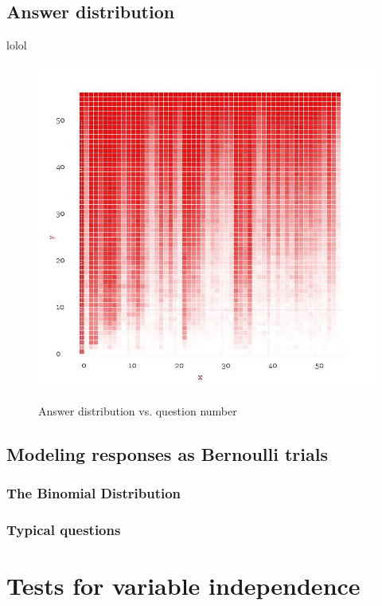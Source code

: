 \documentclass[10pt]{article}
\begin{document}
\subsection{Answer distribution}
lolol
\begin{figure}
\caption{Answer distribution vs. question number}
\label{AnswerDistribution}
\begin{center}
\includegraphics[width=120mm]{ReportMedia/AnswerDistribution.jpg}\\
\end{center}
\end{figure}
\newpage
\subsection{Modeling responses as Bernoulli trials}
\newpage
\subsubsection{The Binomial Distribution}
\newpage
\subsubsection{Typical questions}

\section{Tests for variable independence}
\newpage
\end{document}
